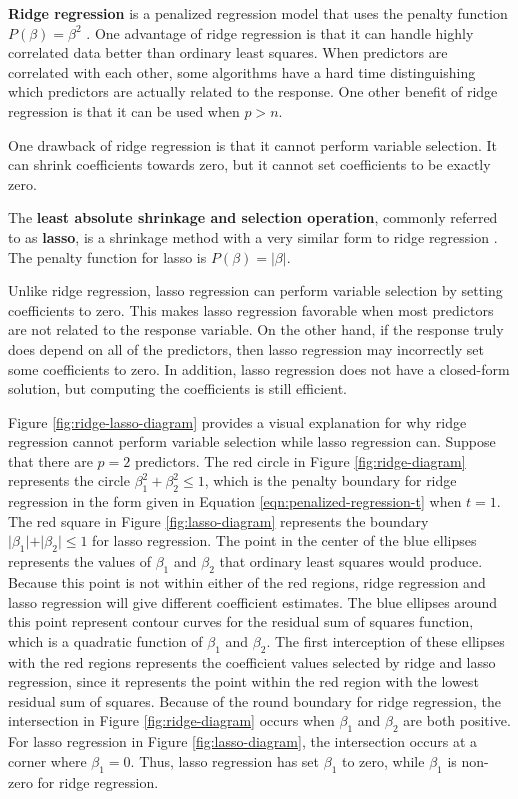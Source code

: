 \documentclass{article}
\begin{document}
\textbf{Ridge regression} is a penalized regression model that uses the penalty function $P(\beta) = \beta^2$ \cite{hoerl1970ridge}. One advantage of ridge regression is that it can handle highly correlated data better than ordinary least squares. When predictors are correlated with each other, some algorithms have a hard time distinguishing which predictors are actually related to the response. One other benefit of ridge regression is that it can be used when $p>n$.

One drawback of ridge regression is that it cannot perform variable selection. It can shrink coefficients towards zero, but it cannot set coefficients to be exactly zero.

The \textbf{least absolute shrinkage and selection operation}, commonly referred to as \textbf{lasso}, is a shrinkage method with a very similar form to ridge regression \cite{tibshirani1996regression, james2013introduction}. The penalty function for lasso is $P(\beta) = \vert \beta \vert$.

Unlike ridge regression, lasso regression can perform variable selection by setting coefficients to zero. This makes lasso regression favorable when most predictors are not related to the response variable. On the other hand, if the response truly does depend on all of the predictors, then lasso regression may incorrectly set some coefficients to zero. In addition, lasso regression does not have a closed-form solution, but computing the coefficients is still efficient.

Figure \ref{fig:ridge-lasso-diagram} provides a visual explanation for why ridge regression cannot perform variable selection while lasso regression can. Suppose that there are $p = 2$ predictors. The red circle in Figure \ref{fig:ridge-diagram} represents the circle $\beta_1^2 + \beta_2^2 \leq 1$, which is the penalty boundary for ridge regression in the form given in Equation \ref{eqn:penalized-regression-t} when $t = 1$. The red square in Figure \ref{fig:lasso-diagram} represents the boundary $\vert \beta_1 \vert + \vert \beta_2 \vert \leq 1$ for lasso regression. The point in the center of the blue ellipses represents the values of $\beta_1$ and $\beta_2$ that ordinary least squares would produce. Because this point is not within either of the red regions, ridge regression and lasso regression will give different coefficient estimates. The blue ellipses around this point represent contour curves for the residual sum of squares function, which is a quadratic function of $\beta_1$ and $\beta_2$. The first interception of these ellipses with the red regions represents the coefficient values selected by ridge and lasso regression, since it represents the point within the red region with the lowest residual sum of squares. Because of the round boundary for ridge regression, the intersection in Figure \ref{fig:ridge-diagram} occurs when $\beta_1$ and $\beta_2$ are both positive. For lasso regression in Figure \ref{fig:lasso-diagram}, the intersection occurs at a corner where $\beta_1=0$. Thus, lasso regression has set $\beta_1$ to zero, while $\beta_1$ is non-zero for ridge regression.
\end{document}
